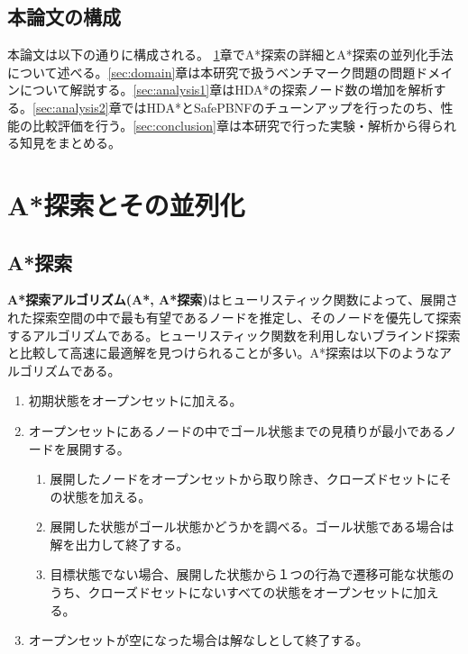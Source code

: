 \documentclass[uplatex]{jsarticle}
\begin{document}
\subsection{本論文の構成}

本論文は以下の通りに構成される。
\ref{sec:define}章でA*探索の詳細とA*探索の並列化手法について述べる。\ref{sec:domain}章は本研究で扱うベンチマーク問題の問題ドメインについて解説する。\ref{sec:analysis1}章はHDA*の探索ノード数の増加を解析する。\ref{sec:analysis2}章ではHDA*とSafePBNFのチューンアップを行ったのち、性能の比較評価を行う。\ref{sec:conclusion}章は本研究で行った実験・解析から得られる知見をまとめる。
\newpage

\section{A*探索とその並列化}
\label{sec:define}
\subsection{A*探索}

\textbf{A*探索アルゴリズム(A*, A*探索)}はヒューリスティック関数によって、展開された探索空間の中で最も有望であるノードを推定し、そのノードを優先して探索するアルゴリズムである\cite{Hart1968}。ヒューリスティック関数を利用しないブラインド探索と比較して高速に最適解を見つけられることが多い。A*探索は以下のようなアルゴリズムである。

\begin{enumerate}
	\item 初期状態をオープンセットに加える。
	\item オープンセットにあるノードの中でゴール状態までの見積りが最小であるノードを展開する。
	\begin{enumerate}
		\item 展開したノードをオープンセットから取り除き、クローズドセットにその状態を加える。
		\item 展開した状態がゴール状態かどうかを調べる。ゴール状態である場合は解を出力して終了する。
		\item 目標状態でない場合、展開した状態から１つの行為で遷移可能な状態のうち、クローズドセットにないすべての状態をオープンセットに加える。
	\end{enumerate}
	\item オープンセットが空になった場合は解なしとして終了する。
\end{enumerate}

\end{document}
